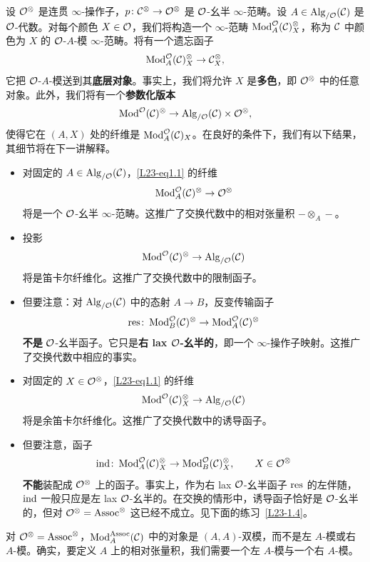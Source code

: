设 $\mathcal{O}^{\otimes}$ 是连贯 $\infty$-操作子，$p\colon\mathcal{C}^{\otimes}\to\mathcal{O}^{\otimes}$ 是 $\mathcal{O}$-幺半 $\infty$-范畴。设 $A\in\operatorname{Alg}_{/\mathcal{O}}(\mathcal{C})$ 是 $\mathcal{O}$-代数。对每个颜色 $X\in\mathcal{O}$，我们将构造一个 $\infty$-范畴 $\operatorname{Mod}^{\mathcal{O}}_{A}(\mathcal{C})^{\otimes}_{X}$，称为 $\mathcal{C}$ 中颜色为 $X$ 的 $\mathcal{O}$-$A$-模 $\infty$-范畴。将有一个遗忘函子
\[
\operatorname{Mod}^{\mathcal{O}}_{A}(\mathcal{C})^{\otimes}_{X}\to\mathcal{C}^{\otimes}_{X},
\]
它把 $\mathcal{O}$-$A$-模送到其\textbf{底层对象}。事实上，我们将允许 $X$ 是\textbf{多色}，即 $\mathcal{O}^{\otimes}$ 中的任意对象。此外，我们将有一个\textbf{参数化版本}
\begin{equation}\label{L23-eq1.1}
\operatorname{Mod}^{\mathcal{O}}(\mathcal{C})^{\otimes}\to\operatorname{Alg}_{/\mathcal{O}}(\mathcal{C})\times\mathcal{O}^{\otimes},
\end{equation}
使得它在 $(A,X)$ 处的纤维是 $\operatorname{Mod}^{\mathcal{O}}_{A}(\mathcal{C})_{X}$。在良好的条件下，我们有以下结果，其细节将在下一讲解释。
\begin{itemize}[leftmargin=2.2em,itemsep=0.1em]
\item 对固定的 $A\in\operatorname{Alg}_{/\mathcal{O}}(\mathcal{C})$，\eqref{L23-eq1.1} 的纤维
\[
\operatorname{Mod}^{\mathcal{O}}_{A}(\mathcal{C})^{\otimes}\to\mathcal{O}^{\otimes}
\]
将是一个 $\mathcal{O}$-幺半 $\infty$-范畴。这推广了交换代数中的相对张量积 $-\otimes_{A}-$。
\item 投影
\[
\operatorname{Mod}^{\mathcal{O}}(\mathcal{C})^{\otimes}\to\operatorname{Alg}_{/\mathcal{O}}(\mathcal{C})
\]
将是笛卡尔纤维化。这推广了交换代数中的限制函子。
\item 但要注意：对 $\operatorname{Alg}_{/\mathcal{O}}(\mathcal{C})$ 中的态射 $A\to B$，反变传输函子
\[
\operatorname{res}\colon\operatorname{Mod}^{\mathcal{O}}_{B}(\mathcal{C})^{\otimes}\to\operatorname{Mod}^{\mathcal{O}}_{A}(\mathcal{C})^{\otimes}
\]
\textbf{不是} $\mathcal{O}$-幺半函子。它只是\textbf{右 lax $\mathcal{O}$-幺半的}，即一个 $\infty$-操作子映射。这推广了交换代数中相应的事实。
\item 对固定的 $X\in\mathcal{O}^{\otimes}$，\eqref{L23-eq1.1} 的纤维
\[
\operatorname{Mod}^{\mathcal{O}}(\mathcal{C})^{\otimes}_{X}\to\operatorname{Alg}_{/\mathcal{O}}(\mathcal{C})
\]
将是余笛卡尔纤维化。这推广了交换代数中的诱导函子。
\item 但要注意，函子
\[
\operatorname{ind}\colon\operatorname{Mod}^{\mathcal{O}}_{A}(\mathcal{C})^{\otimes}_{X}\to\operatorname{Mod}^{\mathcal{O}}_{B}(\mathcal{C})^{\otimes}_{X},\qquad X\in\mathcal{O}^{\otimes}
\]
\textbf{不能}装配成 $\mathcal{O}^{\otimes}$ 上的函子。事实上，作为右 lax $\mathcal{O}$-幺半函子 $\operatorname{res}$ 的左伴随，$\operatorname{ind}$ 一般只应是左 lax $\mathcal{O}$-幺半的。在交换的情形中，诱导函子恰好是 $\mathcal{O}$-幺半的，但对 $\mathcal{O}^{\otimes}=\mathrm{Assoc}^{\otimes}$ 这已经不成立。见下面的练习~\ref{L23-1.4}。
\end{itemize}

\begin{warning}\label{L23-1.3}
对 $\mathcal{O}^{\otimes}=\mathrm{Assoc}^{\otimes}$，$\operatorname{Mod}^{\mathrm{Assoc}}_{A}(\mathcal{C})$ 中的对象是 $(A,A)$-双模，而不是左 $A$-模或右 $A$-模。确实，要定义 $A$ 上的相对张量积，我们需要一个左 $A$-模与一个右 $A$-模。
\end{warning}

